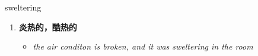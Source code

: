 
\begin{frame}
{\huge sweltering}
\begin{center}
\begin{enumerate}\Large
  \item \textbf{炎热的，酷热的}
  \begin{itemize}
    \item \em{\Large{the air conditon is broken, and it was sweltering in the room}}
  \end{itemize}
\end{enumerate}
\end{center}
\end{frame}
